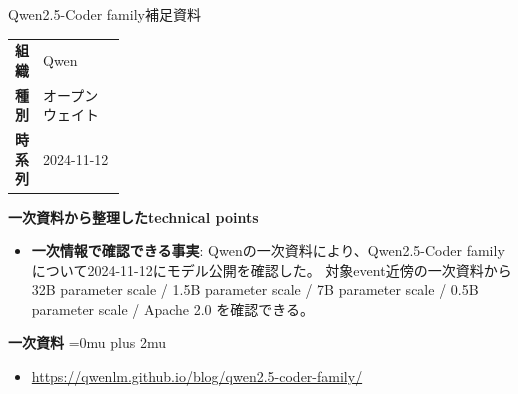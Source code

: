 \begin{technicalnote}{Qwen2.5-Coder family}{補足資料}
\begingroup
\begin{tabularx}{\linewidth}{@{}>{\bfseries}p{0.22\linewidth}X@{}}
組織 & Qwen \\
種別 & オープンウェイト \\
時系列 & 2024-11-12 \\
\end{tabularx}
\smallskip
{\bfseries 一次資料から整理したtechnical points}
\begin{itemize}[leftmargin=1.5em,itemsep=0.35em]
\item \textbf{一次情報で確認できる事実}: Qwenの一次資料により、Qwen2.5-Coder familyについて2024-11-12にモデル公開を確認した。 対象event近傍の一次資料から 32B parameter scale / 1.5B parameter scale / 7B parameter scale / 0.5B parameter scale / Apache 2.0 を確認できる。
\end{itemize}
\begin{minipage}{\linewidth}
\begin{samepage}
{\bfseries 一次資料}
\begingroup\sloppy
\Urlmuskip=0mu plus 2mu\relax
\begin{itemize}[leftmargin=1.5em,itemsep=0.25em]
\item {\scriptsize\url{https://qwenlm.github.io/blog/qwen2.5-coder-family/}}
\end{itemize}
\endgroup
\end{samepage}
\end{minipage}
\endgroup
\end{technicalnote}
\medskip

